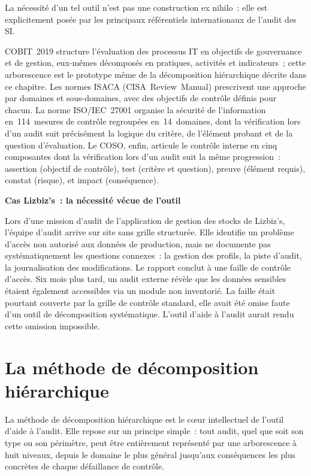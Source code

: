 La nécessité d'un tel outil n'est pas une construction ex nihilo~: elle est
explicitement posée par les principaux référentiels internationaux de l'audit
des SI.

COBIT~2019 structure l'évaluation des processus IT en objectifs de gouvernance et
de gestion, eux-mêmes décomposés en pratiques, activités et indicateurs~; cette
arborescence est le prototype même de la décomposition hiérarchique décrite dans
ce chapitre. Les normes ISACA (CISA~Review~Manual) prescrivent une approche par
domaines et sous-domaines, avec des objectifs de contrôle définis pour chacun.
La norme ISO/IEC~27001 organise la sécurité de l'information en~114~mesures de
contrôle regroupées en~14~domaines, dont la vérification lors d'un audit suit
précisément la logique du critère, de l'élément probant et de la question
d'évaluation. Le COSO, enfin, articule le contrôle interne en cinq composantes
dont la vérification lors d'un audit suit la même progression~: assertion
(objectif de contrôle), test (critère et question), preuve (élément requis),
constat (risque), et impact (conséquence).

\begin{boxlizbiz}
\textbf{Cas Lizbiz's~: la nécessité vécue de l'outil}

Lors d'une mission d'audit de l'application de gestion des stocks de Lizbiz's,
l'équipe d'audit arrive sur site sans grille structurée. Elle identifie un
problème d'accès non autorisé aux données de production, mais ne documente pas
systématiquement les questions connexes~: la gestion des profils, la piste
d'audit, la journalisation des modifications. Le rapport conclut à une faille de
contrôle d'accès. Six mois plus tard, un audit externe révèle que les données
sensibles étaient également accessibles via un module non inventorié. La faille
était pourtant couverte par la grille de contrôle standard, elle avait été
omise faute d'un outil de décomposition systématique. L'outil d'aide à l'audit
aurait rendu cette omission impossible.
\end{boxlizbiz}

\section{La méthode de décomposition hiérarchique}
\label{sec:methode}

La méthode de décomposition hiérarchique est le cœur intellectuel de l'outil
d'aide à l'audit. Elle repose sur un principe simple~: tout audit, quel que soit
son type ou son périmètre, peut être entièrement représenté par une arborescence
à huit niveaux, depuis le domaine le plus général jusqu'aux conséquences les
plus concrètes de chaque défaillance de contrôle.

